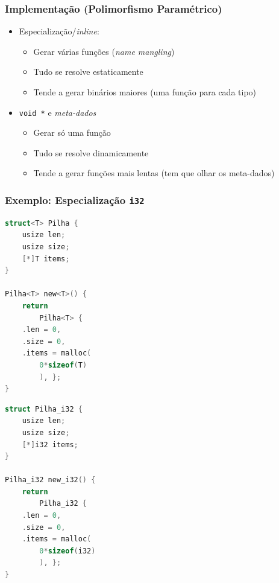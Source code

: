 \documentclass{beamer}
\newcommand{\inlcode}[1]{\texttt{#1}}
\begin{document}
\begin{frame}
    \frametitle{Implementação (Polimorfismo Paramétrico)}
    \begin{itemize}
        \item Especialização/\emph{inline}:
            \begin{itemize}
                \item Gerar várias funções (\emph{name mangling})
                \item Tudo se resolve estaticamente
                \item Tende a gerar binários maiores
                    (uma função para cada tipo)
            \end{itemize}
            \vfill
        \item \inlcode{void *} e \emph{meta-dados}
            \begin{itemize}
                \item Gerar só uma função
                \item Tudo se resolve dinamicamente
                \item Tende a gerar funções mais lentas
                    (tem que olhar os meta-dados)
            \end{itemize}
    \end{itemize}
\end{frame}

\begin{frame}[fragile]
    \frametitle{Exemplo: Especialização \inlcode{i32}}
    \begin{multicols}{2}
        \begin{lstlisting}[language=C]
struct<T> Pilha {
    usize len;
    usize size;
    [*]T items;
}

Pilha<T> new<T>() {
    return
        Pilha<T> {
    .len = 0,
    .size = 0,
    .items = malloc(
        0*sizeof(T)
        ), };
}
        \end{lstlisting}
        \columnbreak
        \begin{lstlisting}[language=C]
struct Pilha_i32 {
    usize len;
    usize size;
    [*]i32 items;
}

Pilha_i32 new_i32() {
    return
        Pilha_i32 {
    .len = 0,
    .size = 0,
    .items = malloc(
        0*sizeof(i32)
        ), };
}
        \end{lstlisting}
    \end{multicols}
\end{frame}
\end{document}
